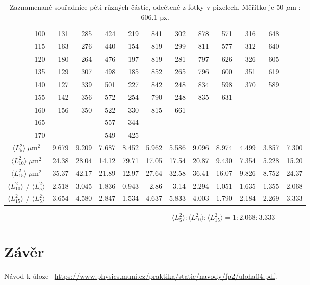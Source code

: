 \documentclass[a4paper,11pt]{article}
\begin{document}
\begin{table}[htpb]
\begin{tabular}{c | r r | r r | r r | r r | r r | c}
       \multicolumn{1}{r|}{100} & 131 & 285 & 424 & 219 & 841 & 302 & 878 & 571 & 316 & 648 &  \\
       \multicolumn{1}{r|}{115} & 163 & 276 & 440 & 154 & 819 & 299 & 811 & 577 & 312 & 640 &  \\
       \multicolumn{1}{r|}{120} & 180 & 264 & 476 & 197 & 819 & 281 & 797 & 626 & 326 & 605 &  \\
       \multicolumn{1}{r|}{135} & 129 & 307 & 498 & 185 & 852 & 265 & 796 & 600 & 351 & 619 &  \\
       \multicolumn{1}{r|}{140} & 127 & 339 & 501 & 227 & 842 & 248 & 834 & 598 & 370 & 589 &  \\
       \multicolumn{1}{r|}{155} & 142 & 356 & 572 & 254 & 790 & 248 & 835 & 631 &     &     &  \\
       \multicolumn{1}{r|}{160} & 156 & 350 & 522 & 330 & 815 & 661 &     &     &     &     &  \\
       \multicolumn{1}{r|}{165} &     &     & 557 & 344 &     &     &     &     &     &     &  \\
       \multicolumn{1}{r|}{170} &     &     & 549 & 425 &     &     &     &     &     &     &  \\\hline\hline

       $ \langle L_5^2  \rangle \ \mu \text{m}^2 $ & 9.679 & 9.209 & 7.687 & 8.452 & 5.962 & 5.586 & 9.096 & 8.974 & 4.499 & 3.857 & 7.300 \\
       $ \langle L_{10}^2  \rangle \ \mu \text{m}^2 $ & 24.38 & 28.04 & 14.12 & 79.71 & 17.05 & 17.54 & 20.87 & 9.430 & 7.354 & 5.228 & 15.20 \\
       $ \langle L_{15}^2  \rangle \ \mu \text{m}^2 $ & 35.37 & 42.17 & 21.89 & 12.97 & 27.64 & 32.58 & 36.41 & 16.07 & 9.826 & 8.752 & 24.37 \\\hline
       $ \langle L_{10}^2 \rangle $ / $ \langle L_5^2 \rangle $ & 2.518 & 3.045 & 1.836 & 0.943 & 2.86 & 3.14 & 2.294 & 1.051 & 1.635 & 1.355 & 2.068 \\
       $ \langle L_{15}^2 \rangle $ / $ \langle L_5^2 \rangle $ & 3.654 & 4.580 & 2.847 & 1.534 & 4.637 & 5.833 & 4.003 & 1.790 & 2.184 & 2.269 & 3.333 \\
       \hline\hline
\end{tabular}
\caption{Zaznamenané souřadnice pěti různých částic, odečtené z fotky v pixelech. Měřítko je 50 $ \mu \text{m} $ : 606.1 px. }
\end{table}

\begin{equation*}
 \langle L_5^2 \rangle : \langle L_{10}^2 \rangle : \langle L_{15}^2 \rangle = 1 : 2.068 : 3.333
\end{equation*}

\begin{figure}[htpb]
    \centering
    
    \caption{}
\end{figure}

\section{Závěr}

\begin{thebibliography}{0}
 Návod k úloze ~\url{https://www.physics.muni.cz/praktika/static/navody/fp2/uloha04.pdf}.   
\end{thebibliography}
\end{document}
